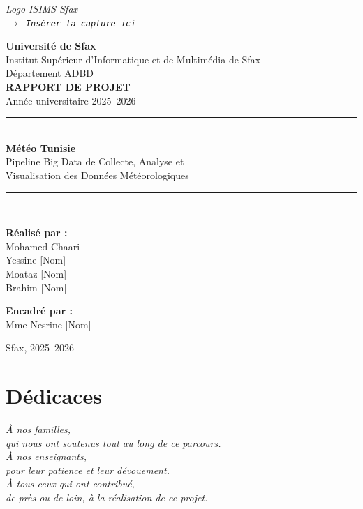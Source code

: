 \documentclass[a4paper,12pt,oneside]{report}
\newcommand{\imgplaceholder}[2]{%
  \begin{tcolorbox}[colback=blue!5,colframe=blue!40,title=#1]
    \centering\itshape #2\\[6pt]
    \texttt{$\rightarrow$ Insérer la capture ici}
  \end{tcolorbox}
}
\begin{document}
\begin{titlepage}
\centering
\vspace*{1cm}

\imgplaceholder{Logo}{Logo ISIMS Sfax}

\vspace{0.5cm}
{\large \textbf{Université de Sfax}}\\[4pt]
{\large Institut Supérieur d'Informatique et de Multimédia de Sfax}\\[4pt]
{\large Département ADBD}\\[1.5cm]

{\Large \textbf{RAPPORT DE PROJET}}\\[0.3cm]
{\large Année universitaire 2025--2026}\\[1.5cm]

\rule{\textwidth}{1.5pt}\\[0.4cm]
{\LARGE \textbf{Météo Tunisie}}\\[0.2cm]
{\Large Pipeline Big Data de Collecte, Analyse et\\Visualisation des Données Météorologiques}\\[0.4cm]
\rule{\textwidth}{1.5pt}\\[2cm]

\begin{minipage}[t]{0.45\textwidth}
\textbf{Réalisé par :}\\
Mohamed Chaari\\
Yessine [Nom]\\
Moataz [Nom]\\
Brahim [Nom]
\end{minipage}
\hfill
\begin{minipage}[t]{0.45\textwidth}
\raggedleft
\textbf{Encadré par :}\\
Mme Nesrine [Nom]
\end{minipage}

\vfill
{\large Sfax, 2025--2026}
\end{titlepage}

\chapter*{Dédicaces}
\thispagestyle{empty}
\vspace*{3cm}
\begin{center}
\textit{À nos familles,\\
qui nous ont soutenus tout au long de ce parcours.\\[1cm]
À nos enseignants,\\
pour leur patience et leur dévouement.\\[1cm]
À tous ceux qui ont contribué,\\
de près ou de loin, à la réalisation de ce projet.}
\end{center}
\newpage
\end{document}
